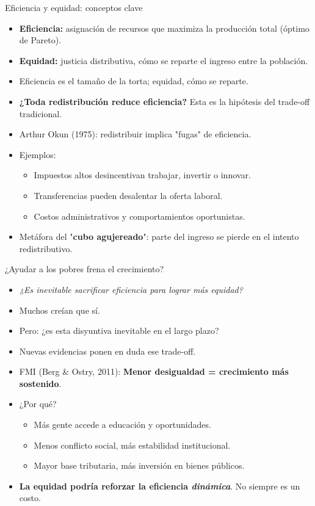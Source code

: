 \documentclass{beamer}
\begin{document}
\begin{frame}{Eficiencia y equidad: conceptos clave}
    \begin{itemize}
        \item \textbf{Eficiencia:} asignación de recursos que maximiza la producción total (óptimo de Pareto).
        \item \textbf{Equidad:} justicia distributiva, cómo se reparte el ingreso entre la población.
        \item Eficiencia es el tamaño de la torta; equidad, cómo se reparte.
        \item \textbf{¿Toda redistribución reduce eficiencia?} Esta es la hipótesis del trade-off tradicional. \pause
        \item Arthur Okun (1975): redistribuir implica "fugas" de eficiencia.
        \item Ejemplos:
        \begin{itemize}
            \item Impuestos altos desincentivan trabajar, invertir o innovar.
            \item Transferencias pueden desalentar la oferta laboral.
            \item Costos administrativos y comportamientos oportunistas.
        \end{itemize}
        \item Metáfora del "\textbf{cubo agujereado}": parte del ingreso se pierde en el intento redistributivo.
    \end{itemize}
\end{frame}

\begin{frame}{¿Ayudar a los pobres frena el crecimiento?}
    \begin{itemize}
        \item \textit{¿Es inevitable sacrificar eficiencia para lograr más equidad?} \pause
        \item Muchos creían que sí.
        \item Pero: ¿es esta disyuntiva inevitable en el largo plazo?
        \item Nuevas evidencias ponen en duda ese trade-off. \pause
        \item FMI (Berg \& Ostry, 2011): \textbf{Menor desigualdad = crecimiento más sostenido}.
        \item ¿Por qué?
        \begin{itemize}
            \item Más gente accede a educación y oportunidades.
            \item Menos conflicto social, más estabilidad institucional.
            \item Mayor base tributaria, más inversión en bienes públicos.
        \end{itemize}
        \item \textbf{La equidad podría reforzar la eficiencia \textit{dinámica}}. No siempre es un costo.
    \end{itemize}
\end{frame}
\end{document}
